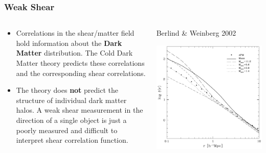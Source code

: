 \documentclass{beamer}
\begin{document}
{
    \frametitle{Weak Shear}
    \fontsize{9}{0.8\baselineskip}

    \begin{columns}
        \begin{column}{0.5\textwidth}
            \begin{itemize}

                \item Correlations in the shear/matter field hold information
                    about the {\bf Dark Matter} distribution.  The Cold Dark
                    Matter theory predicts these correlations and the
                    corresponding shear correlations.

                \item The theory does {\bf not } predict the structure of
                    individual dark matter halos.  A weak shear measurement in
                    the direction of a single object is just a poorly measured
                    and difficult to interpret shear correlation function.

            \end{itemize}
        \end{column}

        \begin{column}{0.5\textwidth}
            \begin{center}
                {\tiny Berlind \& Weinberg 2002}
            \end{center}
            \includegraphics[width=\textwidth]{berlind-weinberg-f3-crop.pdf}
            \newline
        \end{column}
    \end{columns}
}
\end{document}
